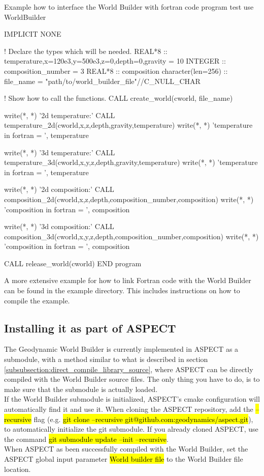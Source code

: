 \documentclass{book}
\newcommand{\GWB}{{Geodynamic World Builder}}
\newcommand{\WB}{{World Builder}}
\newcommand{\aspect}{{ASPECT}}
\newcommand{\cmake}{{cmake}}
\begin{document}
\begin{fortrancode}{Example how to interface the \WB{} with fortran code}
program test
use WorldBuilder

IMPLICIT NONE

  ! Declare the types which will be needed.
  REAL*8 :: temperature,x=120e3,y=500e3,z=0,depth=0,gravity = 10
  INTEGER :: composition_number = 3
  REAL*8 :: composition
  character(len=256) :: file_name = "path/to/world_builder_file"//C_NULL_CHAR

  ! Show how to call the functions.
  CALL create_world(cworld, file_name)

  write(*, *) '2d temperature:'
  CALL temperature_2d(cworld,x,z,depth,gravity,temperature)
  write(*, *) 'temperature in fortran = ', temperature

  write(*, *) '3d temperature:'
  CALL temperature_3d(cworld,x,y,z,depth,gravity,temperature)
  write(*, *) 'temperature in fortran = ', temperature

    write(*, *) '2d composition:'
  CALL composition_2d(cworld,x,z,depth,composition_number,composition)
  write(*, *) 'composition in fortran = ', composition

  write(*, *) '3d composition:'
  CALL composition_3d(cworld,x,y,z,depth,composition_number,composition)
  write(*, *) 'composition in fortran = ', composition

  CALL release_world(cworld)
END program
\end{fortrancode}

A more extensive example for how to link Fortran code with the \WB{} can be found in the example directory. This includes instructions on how to compile the example.

\subsection{Installing it as part of ASPECT}
The \GWB{} is currently implemented in \aspect{} as a submodule, with a method similar to what is described in section \ref{subsubsection:direct_compile_library_source}, where ASPECT can be directly compiled with the \WB{} source files. The only thing you have to do, is to make sure that the submodule is actually loaded.
\\
 If the \WB{} submodule is initialized, \aspect{}'s \cmake{} configuration will automatically find it and use it. When cloning the \aspect{} repository, add the \hl{--recursive} flag (e.g. \hl{git clone --recursive git@github.com:geodynamics/aspect.git}), to automatically initialize the git submodule. If you already cloned \aspect{}, use the command \hl{git submodule update --init --recursive}. 
 \\
 When \aspect{} as been successfully compiled with the \WB{}, set the \aspect{} global input parameter \hl{World builder file} to the \WB{} file location. 
\end{document}
